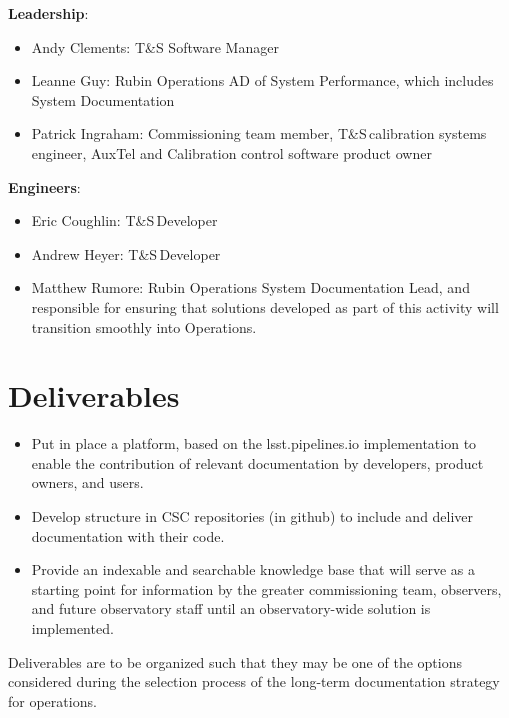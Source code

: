 \documentclass[TS,authoryear,toc]{lsstdoc}
\newcommand{\tns}{T\&S\,}
\begin{document}
\textbf{Leadership}: 
\begin{itemize}
\item Andy Clements:  T\&S Software Manager
\item Leanne Guy: Rubin Operations AD of System Performance, which includes System Documentation
\item  Patrick Ingraham: Commissioning team member, \tns calibration systems engineer, AuxTel and Calibration control software product owner
\end{itemize}

\textbf{Engineers}: 
\begin{itemize}
\item Eric Coughlin:  \tns Developer
\item Andrew Heyer: \tns Developer
\item Matthew Rumore: Rubin Operations System Documentation Lead, and responsible for ensuring that solutions developed as part of this activity will transition smoothly into Operations. 
\end{itemize}

\section{Deliverables}
\begin{itemize}
\item Put in place a platform, based on the lsst.pipelines.io implementation to enable the contribution of relevant documentation by developers, product owners, and users.
\item Develop structure in CSC repositories (in github) to include and deliver documentation with their code.
\item Provide an indexable and searchable knowledge base that will serve as a starting point for information by the greater commissioning team, observers, and future observatory staff until an observatory-wide solution is implemented. 
\end{itemize}
Deliverables are to be organized such that they may be one of the options considered during the selection process of the long-term documentation strategy for operations.
\end{document}

